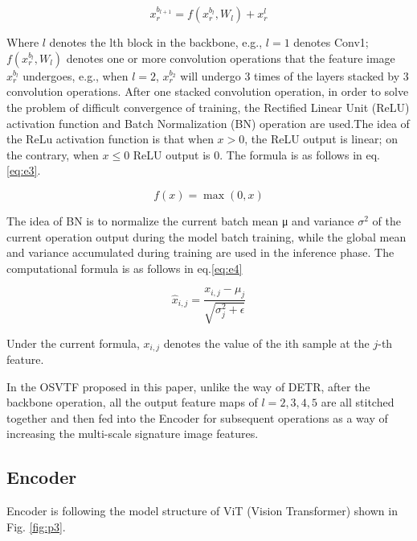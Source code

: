 \documentclass{article}
\begin{document}
\begin{equation}\label{eq:e2}
x_r^{b_{l+1}} = f(x_r^{b_l}, W_l) + x_r^l
\end{equation}

Where $l$ denotes the lth block in the backbone, e.g., $l=1$ denotes Conv1; $f(x_r^{b_l}, W_l)$ denotes one or more convolution operations that the feature image $x_r^{b_l}$ undergoes, e.g., when $l=2$, $x_r^{b_2}$ will undergo 3 times of the layers stacked by 3 convolution operations. After one stacked convolution operation, in order to solve the problem of difficult convergence of training, the Rectified Linear Unit (ReLU) \cite{21} activation function and Batch Normalization (BN) \cite{22} operation are used.The idea of the ReLu activation function is that when $x>0$, the ReLU output is linear; on the contrary, when $x\leq 0$ ReLU output is 0. The formula is as follows in eq.\ref{eq:e3}.

\begin{equation}\label{eq:e3}
f(x) = \max(0,x)
\end{equation}

The idea of BN is to normalize the current batch mean μ and variance $\sigma^2$ of the current operation output during the model batch training, while the global mean and variance accumulated during training are used in the inference phase. The computational formula is as follows in eq.\ref{eq:e4}

\begin{equation}\label{eq:e4}
\hat{x}_{i,j}= \frac{x_{i,j} - \mu_j}{\sqrt{\sigma_j^2+\epsilon}}
\end{equation}

Under the current formula, $x_{i,j}$ denotes the value of the ith sample at the $j$-th feature.

In the OSVTF proposed in this paper, unlike the way of DETR, after the backbone operation, all the output feature maps of $l=2,3,4,5$ are all stitched together and then fed into the Encoder for subsequent operations as a way of increasing the multi-scale signature image features.

\subsection{Encoder}

Encoder is following the model structure of ViT (Vision Transformer) \cite{14} shown in Fig. \ref{fig:p3}.
\end{document}
